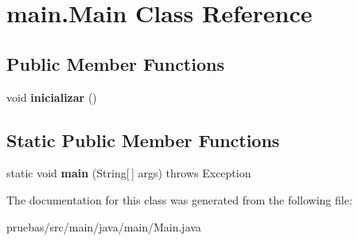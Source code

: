 \hypertarget{classmain_1_1_main}{}\section{main.\+Main Class Reference}
\label{classmain_1_1_main}
\subsection*{Public Member Functions}
\begin{DoxyCompactItemize}
\item 
\mbox{\label{classmain_1_1_main_ad6d72b7263cb2cdb870dac7ae778adef}} 
void {\bfseries inicializar} ()
\end{DoxyCompactItemize}
\subsection*{Static Public Member Functions}
\begin{DoxyCompactItemize}
\item 
\mbox{\label{classmain_1_1_main_a896f71a651b705304693dbfe0cf9ca63}} 
static void {\bfseries main} (String\mbox{[}$\,$\mbox{]} args)  throws Exception 
\end{DoxyCompactItemize}


The documentation for this class was generated from the following file\+:\begin{DoxyCompactItemize}
\item 
pruebas/src/main/java/main/Main.\+java\end{DoxyCompactItemize}
